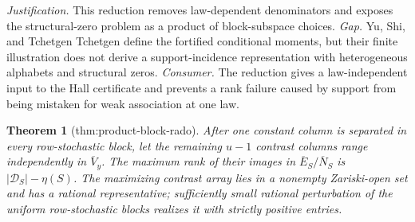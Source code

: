 \documentclass{article}
\newtheorem{theorem}{Theorem}
\begin{document}
\par\smallskip\noindent \textit{Justification.} This reduction removes law-dependent denominators and exposes the structural-zero problem as a product of block-subspace choices. \textit{Gap.} Yu, Shi, and Tchetgen Tchetgen define the fortified conditional moments, but their finite illustration does not derive a support-incidence representation with heterogeneous alphabets and structural zeros. \textit{Consumer.} The reduction gives a law-independent input to the Hall certificate and prevents a rank failure caused by support from being mistaken for weak association at one law.

\begin{theorem}[thm:product-block-rado]\label{thm:product-block-rado}
After one constant column is separated in every row-stochastic block, let the remaining \(u-1\) contrast columns range independently in \(\overline V_y\). The maximum rank of their images in \(\overline E_S/\overline N_S\) is \(|\mathcal D_S|-\eta(S)\). The maximizing contrast array lies in a nonempty Zariski-open set and has a rational representative; sufficiently small rational perturbation of the uniform row-stochastic blocks realizes it with strictly positive entries.
\end{theorem}
\end{document}
